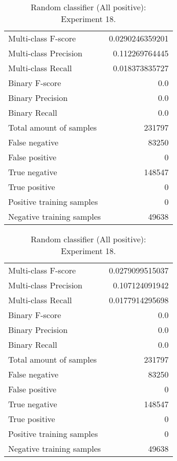 \begin{table}[H]
\begin{minipage}{0.5\textwidth}
\caption{Random classifier (All positive): \\Experiment 17.}
\centering
\begin{tabular}{l r}
\toprule
Multi-class F-score & 0.0290246359201 \\
Multi-class Precision & 0.112269764445 \\
Multi-class Recall & 0.018373835727 \\
\midrule
Binary F-score & 0.0 \\
Binary Precision & 0.0 \\
Binary Recall & 0.0 \\
\midrule
Total amount of samples & 231797 \\
False negative & 83250 \\
False positive & 0 \\
True negative & 148547 \\
True positive & 0 \\
\midrule
Positive training samples & 0 \\
Negative training samples & 49638 \\
\bottomrule
\end{tabular}
\end{minipage}
\hfillx
\begin{minipage}{0.5\textwidth}
\caption{Random classifier (All positive): \\Experiment 18.}
\centering
\begin{tabular}{l r}
\toprule
Multi-class F-score & 0.0279099515037 \\
Multi-class Precision & 0.107124091942 \\
Multi-class Recall & 0.0177914295698 \\
\midrule
Binary F-score & 0.0 \\
Binary Precision & 0.0 \\
Binary Recall & 0.0 \\
\midrule
Total amount of samples & 231797 \\
False negative & 83250 \\
False positive & 0 \\
True negative & 148547 \\
True positive & 0 \\
\midrule
Positive training samples & 0 \\
Negative training samples & 49638 \\
\bottomrule
\end{tabular}
\end{minipage}
\end{table}
